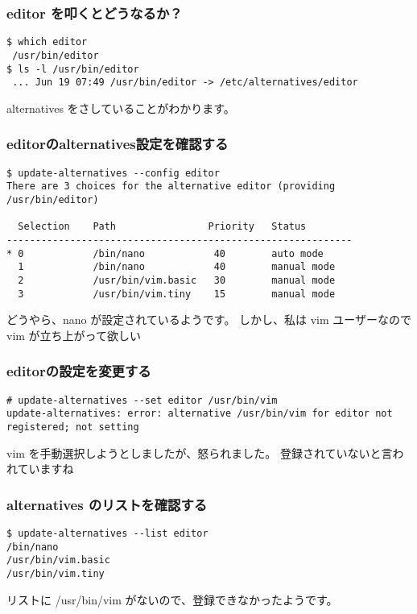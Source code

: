 \documentclass[cjk,dvipdfmx,12pt,compress,%
hyperref={bookmarks=true,bookmarksnumbered=true,bookmarksopen=false,%
colorlinks=false,%
pdftitle={第 120 回 関西 Debian 勉強会},%
pdfauthor={倉敷・のがた・佐々木・かわだ・おおつき},%
pdfsubject={資料},%
}]{beamer}
\begin{document}
\begin{frame}[fragile]
  \frametitle{editor を叩くとどうなるか？}
\begin{footnotesize}
    \begin{verbatim}
$ which editor
 /usr/bin/editor
$ ls -l /usr/bin/editor
 ... Jun 19 07:49 /usr/bin/editor -> /etc/alternatives/editor
    \end{verbatim}
\end{footnotesize}
  alternatives をさしていることがわかります。
\end{frame}

\begin{frame}[fragile]
  \frametitle{editorのalternatives設定を確認する}
\begin{tiny}
\begin{verbatim}
$ update-alternatives --config editor
There are 3 choices for the alternative editor (providing /usr/bin/editor)

  Selection    Path                Priority   Status
------------------------------------------------------------
* 0            /bin/nano            40        auto mode
  1            /bin/nano            40        manual mode
  2            /usr/bin/vim.basic   30        manual mode
  3            /usr/bin/vim.tiny    15        manual mode
\end{verbatim}
\end{tiny}
どうやら、nano が設定されているようです。
しかし、私は vim ユーザーなので vim が立ち上がって欲しい
\end{frame}

\begin{frame}[fragile]
  \frametitle{editorの設定を変更する}
\begin{tiny}
\begin{verbatim}
# update-alternatives --set editor /usr/bin/vim
update-alternatives: error: alternative /usr/bin/vim for editor not registered; not setting
\end{verbatim}
\end{tiny}
vim を手動選択しようとしましたが、怒られました。
登録されていないと言われていますね
\end{frame}

\begin{frame}[fragile]
  \frametitle{alternatives のリストを確認する}
\begin{footnotesize}
\begin{verbatim}
$ update-alternatives --list editor
/bin/nano
/usr/bin/vim.basic
/usr/bin/vim.tiny
\end{verbatim}
\end{footnotesize}
リストに /usr/bin/vim がないので、登録できなかったようです。
\end{frame}
\end{document}
